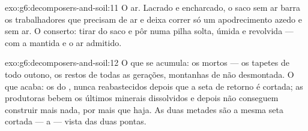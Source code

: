 \begin{solution}{exo:g6:decomposers-and-soil:11}
O ar. Lacrado e encharcado, o saco sem ar barra os trabalhadores que
precisam de ar e deixa correr só um apodrecimento azedo e sem ar. O
conserto: tirar do saco e pôr numa pilha solta, úmida e revolvida ---
com a  mantida e o ar admitido.
\end{solution}

\begin{solution}{exo:g6:decomposers-and-soil:12}
O que se acumula: os mortos --- os tapetes de todo outono, os restos
de todas as gerações, montanhas de  não desmontada. O
que acaba: os  do , nunca reabastecidos depois que a
seta de retorno é cortada; as produtoras bebem os últimos minerais
dissolvidos e depois não conseguem construir mais nada, por mais 
que haja. As duas metades são a mesma seta cortada --- a 
--- vista das duas pontas.
\end{solution}

